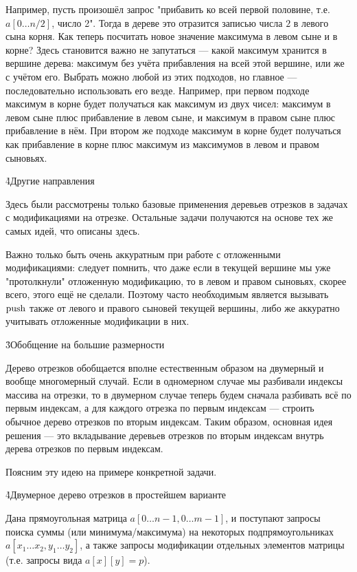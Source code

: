 Например, пусть произошёл запрос "прибавить ко всей первой половине, т.е. $a[0 \ldots n/2]$, число 2". Тогда в дереве это отразится записью числа $2$ в левого сына корня. Как теперь посчитать новое значение максимума в левом сыне и в корне? Здесь становится важно не запутаться --- какой максимум хранится в вершине дерева: максимум без учёта прибавления на всей этой вершине, или же с учётом его. Выбрать можно любой из этих подходов, но главное --- последовательно использовать его везде. Например, при первом подходе максимум в корне будет получаться как максимум из двух чисел: максимум в левом сыне плюс прибавление в левом сыне, и максимум в правом сыне плюс прибавление в нём. При втором же подходе максимум в корне будет получаться как прибавление в корне плюс максимум из максимумов в левом и правом сыновьях.

\h4{Другие направления}

Здесь были рассмотрены только базовые применения деревьев отрезков в задачах с модификациями на отрезке. Остальные задачи получаются на основе тех же самых идей, что описаны здесь.

Важно только быть очень аккуратным при работе с отложенными модификациями: следует помнить, что даже если в текущей вершине мы уже "протолкнули" отложенную модификацию, то в левом и правом сыновьях, скорее всего, этого ещё не сделали. Поэтому часто необходимым является вызывать $\rm push$ также от левого и правого сыновей текущей вершины, либо же аккуратно учитывать отложенные модификации в них.


\h3{Обобщение на большие размерности}

Дерево отрезков обобщается вполне естественным образом на двумерный и вообще многомерный случай. Если в одномерном случае мы разбивали индексы массива на отрезки, то в двумерном случае теперь будем сначала разбивать всё по первым индексам, а для каждого отрезка по первым индексам --- строить обычное дерево отрезков по вторым индексам. Таким образом, основная идея решения --- это вкладывание деревьев отрезков по вторым индексам внутрь дерева отрезков по первым индексам.

Поясним эту идею на примере конкретной задачи.

\h4{Двумерное дерево отрезков в простейшем варианте}

Дана прямоугольная матрица $a[0 \ldots n-1, 0 \ldots m-1]$, и поступают запросы поиска суммы (или минимума/максимума) на некоторых подпрямоугольниках $a[x_1 \ldots x_2, y_1 \ldots y_2]$, а также запросы модификации отдельных элементов матрицы (т.е. запросы вида $a[x][y] = p$).

